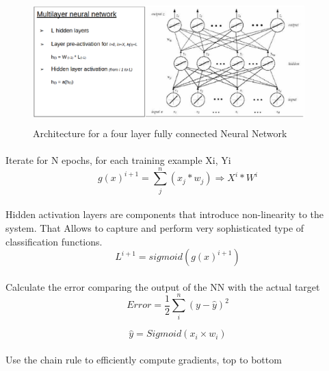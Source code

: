 \documentclass{llncs}       %
\begin{document}
\begin{figure}[h]
\centering
\includegraphics[width=10.51cm,height=4.77cm]{media/deep-nn.eps}
\caption{Architecture for a four layer fully connected 
Neural Network}
\end{figure}


\paragraph{}Iterate for N epochs,  for each training example Xi, Yi 
\begin{equation} 
g(x)^{i+1}=\sum_j^n(x_{j}*w_{j})\Rightarrow X^{i}*W^{i}
\end{equation}

\paragraph{}
Hidden activation layers are components that introduce non-linearity to 
the system. That Allows to capture and perform very sophisticated type 
of classification functions.
\begin{equation} 
L^{i+1}=sigmoid(g(x)^{i+1})
\end{equation}

\paragraph{}Calculate the error comparing the output of the NN with the actual target 
\begin{equation} 
Error = \frac{1}{2}\sum_i^n( y -\widehat{y})^2
\end{equation}

\begin{equation} 
\widehat{y}=Sigmoid(x_{i}\times w_{i})
\end{equation}

\paragraph{} Use the chain rule to efficiently compute gradients, top to bottom
\end{document}
